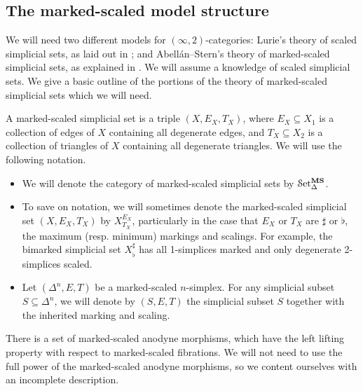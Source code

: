 \documentclass[main.tex]{subfiles}
\begin{document}
\subsection{The marked-scaled model structure}
\label{ssc:marked-scaled_model_structure}

We will need two different models for $(\infty,2)$-categories: Lurie's theory of scaled simplicial sets, as laid out in \cite{lurie2009infinity}; and Abell\'an--Stern's theory of marked-scaled simplicial sets, as explained in \cite{garcia2cartesianfibrationsii}. We will assume a knowledge of scaled simplicial sets. We give a basic outline of the portions of the theory of marked-scaled simplicial sets which we will need.

A marked-scaled simplicial set is a triple $(X, E_{X}, T_{X})$, where $E_{X} \subseteq X_{1}$ is a collection of edges of $X$ containing all degenerate edges, and $T_{X} \subseteq X_{2}$ is a collection of triangles of $X$ containing all degenerate triangles. We will use the following notation.
\begin{itemize}
  \item We will denote the category of marked-scaled simplicial sets by $\mathcal{S}\mathrm{et}_{\Delta}^{\mathbf{MS}}$.

  \item To save on notation, we will sometimes denote the marked-scaled simplicial set $(X, E_{X}, T_{X})$ by $X^{E_{X}}_{T_{X}}$, particularly in the case that $E_{X}$ or $T_{X}$ are $\sharp$ or $\flat$, the maximum (resp. minimum) markings and scalings. For example, the bimarked simplicial set $X^{\sharp}_{\flat}$ has all 1-simplices marked and only degenerate 2-simplices scaled.

  \item Let $(\Delta^{n}, E, T)$ be a marked-scaled $n$-simplex. For any simplicial subset $S \subseteq \Delta^{n}$, we will denote by $(S, E, T)$ the simplicial subset $S$ together with the inherited marking and scaling.
\end{itemize}

There is a set of marked-scaled anodyne morphisms, which have the left lifting property with respect to marked-scaled fibrations. We will not need to use the full power of the marked-scaled anodyne morphisms, so we content ourselves with an incomplete description.
\end{document}
